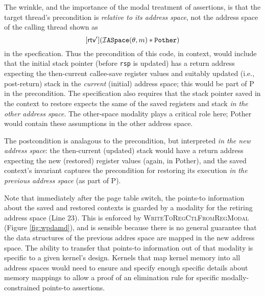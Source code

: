 The wrinkle, and the importance of the modal treatment of assertions, is that the target thread's precondition is \emph{relative to its address space}, 
not the address space of the calling thread shown as 
\[[\textsf{rtv}'](\mathcal{I}\texttt{ASpace}(\theta,m) \ast \texttt{Pother})\]
in the specfication. 
Thus the precondition of this code,
in context, would include that the initial stack pointer (before \lstinline|rsp| is updated)
has a return address expecting the then-current callee-save register values and 
suitably updated (i.e., post-return) stack in the \emph{current} (initial) address space;
this would be part of \textsf{P} in the precondition.
The specification also requires that
the stack pointer saved in the context to restore expects the same of the saved registers and stack 
\emph{in the other address space}. 
The other-space modality plays a critical role here; \textsf{Pother} would contain these assumptions in the other
address space.


The postcondition is analagous to the precondition, but interpreted \emph{in the new address space}: the then-current (updated) stack would have a return address expecting the new (restored) register values (again, in \textsf{Pother}),
and the saved context's invariant captures the precondition for restoring its execution \emph{in the previous address space} (as part of \textsf{P}). 

Note that immediately after the page table switch, the points-to information about the saved and restored contexts is guarded by a modality for the retiring
address space \rtv (Line 23). This is enforced by \textsc{WriteToRegCtlFromRegModal} (Figure \ref{fig:wpdamd}), and is sensible because
there is no general guarantee that the data structures of the previous addres space are mapped in the new address space.
The ability to transfer that points-to information out of that modality is specific to a given kernel's design. 
Kernels that map kernel memory into all address spaces would need to ensure and specify enough specific details about memory mappings to allow a 
proof of an elimination rule for specific modally-constrained points-to assertions.

